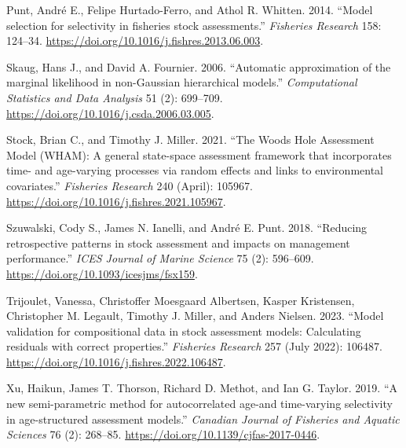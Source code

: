 \documentclass[
]{article}
\newlength{\cslhangindent}
\newlength{\cslentryspacingunit} %
\newenvironment{CSLReferences}[2] %
 {%
  \setlength{\parindent}{0pt}
  \ifodd #1
  \let\oldpar\par
  \def\par{\hangindent=\cslhangindent\oldpar}
  \fi
  \setlength{\parskip}{#2\cslentryspacingunit}
 }%
 {}
\begin{document}
\begin{CSLReferences}{1}{0}
\leavevmode{}%
Punt, André E., Felipe Hurtado-Ferro, and Athol R. Whitten. 2014.
{``{Model selection for selectivity in fisheries stock assessments}.''}
\emph{Fisheries Research} 158: 124--34.
\url{https://doi.org/10.1016/j.fishres.2013.06.003}.

\leavevmode{}%
Skaug, Hans J., and David A. Fournier. 2006. {``{Automatic approximation
of the marginal likelihood in non-Gaussian hierarchical models}.''}
\emph{Computational Statistics and Data Analysis} 51 (2): 699--709.
\url{https://doi.org/10.1016/j.csda.2006.03.005}.

\leavevmode{}%
Stock, Brian C., and Timothy J. Miller. 2021. {``{The Woods Hole
Assessment Model (WHAM): A general state-space assessment framework that
incorporates time- and age-varying processes via random effects and
links to environmental covariates}.''} \emph{Fisheries Research} 240
(April): 105967. \url{https://doi.org/10.1016/j.fishres.2021.105967}.

\leavevmode{}%
Szuwalski, Cody S., James N. Ianelli, and André E. Punt. 2018.
{``{Reducing retrospective patterns in stock assessment and impacts on
management performance}.''} \emph{ICES Journal of Marine Science} 75
(2): 596--609. \url{https://doi.org/10.1093/icesjms/fsx159}.

\leavevmode{}%
Trijoulet, Vanessa, Christoffer Moesgaard Albertsen, Kasper Kristensen,
Christopher M. Legault, Timothy J. Miller, and Anders Nielsen. 2023.
{``{Model validation for compositional data in stock assessment models:
Calculating residuals with correct properties}.''} \emph{Fisheries
Research} 257 (July 2022): 106487.
\url{https://doi.org/10.1016/j.fishres.2022.106487}.

\leavevmode{}%
Xu, Haikun, James T. Thorson, Richard D. Methot, and Ian G. Taylor.
2019. {``{A new semi-parametric method for autocorrelated age-and
time-varying selectivity in age-structured assessment models}.''}
\emph{Canadian Journal of Fisheries and Aquatic Sciences} 76 (2):
268--85. \url{https://doi.org/10.1139/cjfas-2017-0446}.

\end{CSLReferences}
\end{document}
